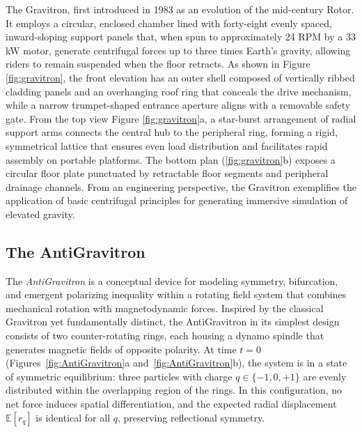 \documentclass[11pt]{article}
\begin{document}
The Gravitron, first introduced in 1983 as an evolution of the mid-century Rotor. It employs a circular, enclosed chamber lined with forty-eight evenly spaced, inward-sloping support panels that, when spun to approximately 24 RPM by a 33 kW motor, generate centrifugal forces up to three times Earth’s gravity, allowing riders to remain suspended when the floor retracts. As shown in Figure \ref{fig:gravitron}, the front elevation has an outer shell composed of vertically ribbed cladding panels and an overhanging roof ring that conceals the drive mechanism, while a narrow trumpet-shaped entrance aperture aligns with a removable safety gate. From the top view Figure \ref{fig:gravitron}a, a star-burst arrangement of radial support arms connects the central hub to the peripheral ring, forming a rigid, symmetrical lattice that ensures even load distribution and facilitates rapid assembly on portable platforms. The bottom plan (\ref{fig:gravitron}b) exposes a circular floor plate punctuated by retractable floor segments and peripheral drainage channels. From an engineering perspective, the Gravitron exemplifies the application of basic centrifugal principles for generating immersive simulation of elevated gravity.

\subsection{The AntiGravitron}

The \textit{AntiGravitron} is a conceptual device for modeling symmetry, bifurcation, and emergent polarizing inequality within a rotating field system that combines mechanical rotation with magnetodynamic forces. Inspired by the classical Gravitron yet fundamentally distinct, the AntiGravitron in its simplest design consists of two counter-rotating rings, each housing a dynamo spindle that generates magnetic fields of opposite polarity. At time $t = 0$ (Figures~\ref{fig:AntiGravitron}a and~\ref{fig:AntiGravitron}b), the system is in a state of symmetric equilibrium: three particles with charge $q \in \{-1, 0, +1\}$ are evenly distributed within the overlapping region of the rings. In this configuration, no net force induces spatial differentiation, and the expected radial displacement $\mathbb{E}[r_q]$ is identical for all $q$, preserving reflectional symmetry.
\end{document}
